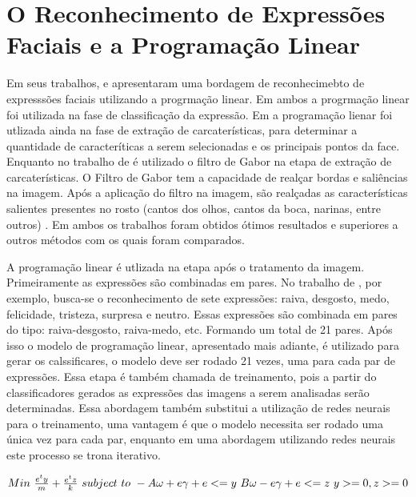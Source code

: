 \section{O Reconhecimento de Expressões Faciais e a Programação Linear}

Em seus trabalhos,  e  apresentaram uma bordagem de reconhecimebto de expresssões faciais utilizando a progrmação linear. Em ambos a progrmação linear foi utilizada na fase de classificação da expressão. Em  a programação lienar foi utlizada ainda na fase de extração de carcaterísticas, para determinar a quantidade de caracteríticas a serem selecionadas e os principais pontos da face. Enquanto no trabalho de \cite{Feng} é utilizado o filtro de Gabor na etapa de extração de carcaterísticas. O Filtro de Gabor tem a capacidade de realçar bordas e saliências na imagem. Após a aplicação do filtro na imagem, são realçadas as características salientes presentes no rosto (cantos dos olhos, cantos da boca, narinas, entre outros) \cite{Gabor}. Em ambos os trabalhos foram obtidos ótimos resultados e superiores a outros métodos com os quais foram comparados. 

A programação linear é utlizada na etapa após o tratamento da imagem. Primeiramente as expressões são combinadas em pares. No trabalho de \cite{Feng}, por exemplo, busca-se o reconhecimento de sete expressões: raiva, desgosto, medo, felicidade, tristeza, surpresa e neutro. Essas expressões são combinada em pares do tipo: raiva-desgosto, raiva-medo, etc. Formando um total de 21 pares. Após isso o modelo de programação linear, apresentado mais adiante, é utilizado para gerar os calssificares, o modelo deve ser rodado 21 vezes, uma para cada par de expressões. Essa etapa é também chamada de treinamento, pois a partir do classificadores gerados as expressões das imagens a serem analisadas serão determinadas. Essa abordagem também substitui a utilização de redes neurais para o treinamento, uma vantagem é que o modelo necessita ser rodado uma única vez para cada par, enquanto em uma abordagem utilizando redes neurais este processo se trona iterativo.

$Min\ \frac{e^{t}y}{m} + \frac{e^{t}z}{k}\\
\ subject\ to  \\
\              -A\omega + e\gamma + e <= y\\
\              B\omega - e\gamma + e <= z\\
\              y>= 0, z>= 0 $

